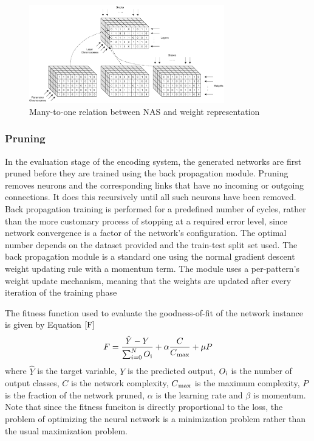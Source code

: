 \documentclass[conference]{IEEEtran}
\begin{document}
\begin{figure}[!b]
\centerline{\includegraphics[width=85mm]{part3.png}}
\caption{Many-to-one relation between NAS and weight representation}
\label{part3}
\end{figure}
\subsubsection{Pruning}
In the evaluation stage of the encoding system, the generated networks are first pruned before they are trained using the back propagation module. Pruning removes neurons and the corresponding links that have no incoming or outgoing connections. It does this recursively until all such neurons have been removed. Back propagation training is performed for a predefined number of cycles, rather than the more customary process of stopping at a required error level, since network convergence is a factor of the network's configuration. The optimal number depends on the dataset provided and the train-test split set used. The back propagation module is a standard one using the normal gradient descent weight updating rule with a momentum term. The module uses a per-pattern's weight update mechanism, meaning that the weights are updated after every iteration of the training phase

The fitness function used to evaluate the goodness-of-fit of the network instance is given by Equation $\ref{F}$ 
\begin{equation}
F = \frac{\hat{Y}-Y}{\sum_{i=0}^{N}O\textsubscript{i}} + \alpha\frac{C}{C\textsubscript{max}} + \mu P
\label{F}
\end{equation}
where $\hat{Y}$ is the target variable, $Y$ is the predicted output, $O\textsubscript{i}$ is the number of output classes, $C$ is the network complexity, $C\textsubscript{max}$ is the maximum complexity, $P$ is the fraction of the network pruned, $\alpha$ is the learning rate and $\beta$ is momentum.  Note that since the fitness funciton is directly proportional to the loss, the problem of optimizing the neural network is a minimization problem rather than the usual maximization problem. 
\end{document}
